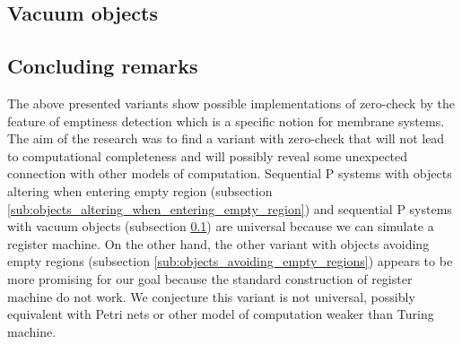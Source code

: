 
\subsection{Vacuum objects} %
\label{sub:vacuum_objects}


\subsection{Concluding remarks} %
\label{sub:concluding_remarks_of_emptiness_detection}

The above presented variants show possible implementations of zero-check by the feature of emptiness detection which is a specific notion for membrane systems. The aim of the research was to find a variant with zero-check that will not lead to computational completeness and will possibly reveal some unexpected connection with other models of computation. Sequential P systems with objects altering when entering empty region (subsection \ref{sub:objects_altering_when_entering_empty_region}) and sequential P systems with vacuum objects (subsection \ref{sub:vacuum_objects}) are universal because we can simulate a register machine. On the other hand, the other variant with objects avoiding empty regions (subsection \ref{sub:objects_avoiding_empty_regions}) appears to be more promising for our goal because the standard construction of register machine do not work. We conjecture this variant is not universal, possibly equivalent with Petri nets or other model of computation weaker than Turing machine.


